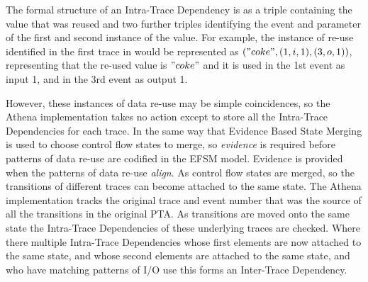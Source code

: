 
The formal structure of an Intra-Trace Dependency is as a triple containing the value that was reused and two further triples identifying the event and parameter of the first and second instance of the value. For example, the instance of re-use identified in the first trace in  would be represented as $("coke",(1,i,1),(3,o,1))$, representing that the re-used value is $"coke"$ and it is used in the 1st event as input 1, and in the 3rd event as output 1.

However, these instances of data re-use may be simple coincidences, so the Athena implementation takes no action except to store all the Intra-Trace Dependencies for each trace. In the same way that Evidence Based State Merging is used to choose control flow states to merge, so \emph{evidence} is required before patterns of data re-use are codified in the EFSM model. Evidence is provided when the patterns of data re-use \emph{align}. As control flow states are merged, so the transitions of different traces can become attached to the same state. The Athena implementation tracks the original trace and event number that was the source of all the transitions in the original PTA. As transitions are moved onto the same state the Intra-Trace Dependencies of these underlying traces are checked. Where there multiple Intra-Trace Dependencies whose first elements are now attached to the same state, and whose second elements are attached to the same state, and who have matching patterns of I/O use this forms an Inter-Trace Dependency. 

